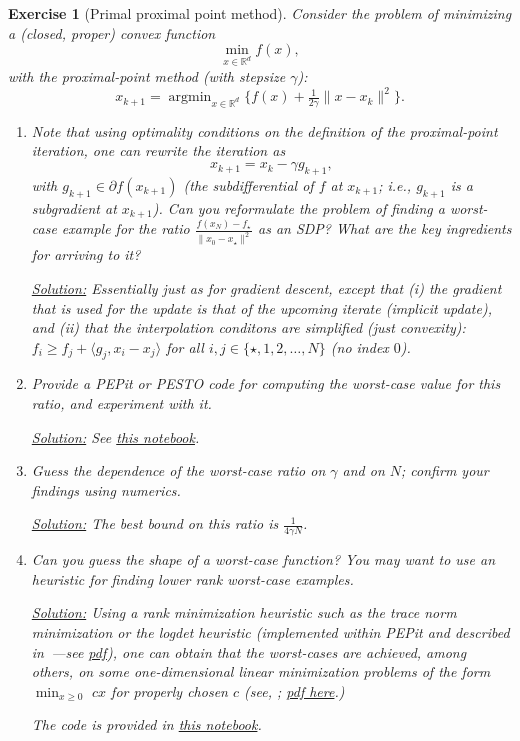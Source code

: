 \documentclass[11pt,a4paper]{article}
\newcommand{\inner}[2]{{\langle #1, #2\rangle}}
\DeclareMathOperator*{\argmin}{argmin}
\newcommand{\pesto}{{PESTO }}
\newcommand{\pepit}{{PEPit }}
\newcommand{\correction}[1]{{{\color{blue}\underline{Solution:} #1}}}
\newcommand{\correction}[1]{}
\newtheorem{exercise}{Exercise}
\begin{document}
	\begin{exercise}[Primal proximal point method]\label{ex:ppm}
	Consider the problem of minimizing a (closed, proper) convex function
	\[ \min_{x\in\mathbb{R}^d} f(x),\]
	with the proximal-point method (with stepsize $\gamma$):
	\[ x_{k+1}=\argmin_{x\in\mathbb{R}^d} \{ f(x)+\tfrac{1}{2\gamma}\|x-x_k\|^2\}.\]
	\begin{enumerate}
	\item Note that using optimality conditions on the definition of the proximal-point iteration, one can rewrite the iteration as
	\[ x_{k+1} = x_k - \gamma g_{k+1}, \]
	with $g_{k+1}\in\partial f(x_{k+1})$ (the subdifferential of $f$ at $x_{k+1}$; i.e., $g_{k+1}$ is a subgradient at $x_{k+1}$). Can you reformulate the problem of finding a worst-case example for the ratio $\frac{f(x_N)-f_\star}{\|x_0-x_\star\|^2}$ as an SDP? What are the key ingredients for arriving to it?
	
	\correction{Essentially just as for gradient descent, except that (i) the gradient that is used for the update is that of the upcoming iterate (implicit update), and (ii) that the interpolation conditons are simplified (just convexity): $f_i\geqslant f_j+\inner{g_j}{x_i-x_j}$ for all $i,j\in\{\star,1,2,\ldots,N\}$ (no index $0$).}
	
	\item Provide a \pepit or \pesto code for computing the worst-case value for this ratio, and experiment with it.
	
	\correction{See \href{https://github.com/PerformanceEstimation/Learning-Performance-Estimation/tree/main/Codes/Jupyter/Exercise04.ipynb}{this notebook}.}
	
	\item Guess the dependence of the worst-case ratio on $\gamma$ and on $N$; confirm your findings using numerics.
	
	\correction{The best bound on this ratio is $\frac{1}{4\gamma N}$.}
	
	\item Can you guess the shape of a worst-case function? You may want to use an heuristic for finding lower rank worst-case examples.
	
	\correction{Using a rank minimization heuristic such as the trace norm minimization or the logdet heuristic (implemented within \pepit and described in~\cite{fazel2003log}---see \href{https://web.stanford.edu/~boyd/papers/pdf/rank_min_heur_hankel.pdf}{pdf}), one can obtain that the worst-cases are achieved, among others, on some one-dimensional linear minimization problems of the form $\min_{x\geqslant 0} \,\, cx$ for properly chosen $c$ (see, \cite[Theorem 4.1]{taylor2015exact}; \href{https://arxiv.org/pdf/1512.07516.pdf}{pdf here}.)
	
	The code is provided in \href{https://github.com/PerformanceEstimation/Learning-Performance-Estimation/tree/main/Codes/Jupyter/Exercise04.ipynb}{this notebook}.}
	\end{enumerate}
	\end{exercise}
	
\end{document}
